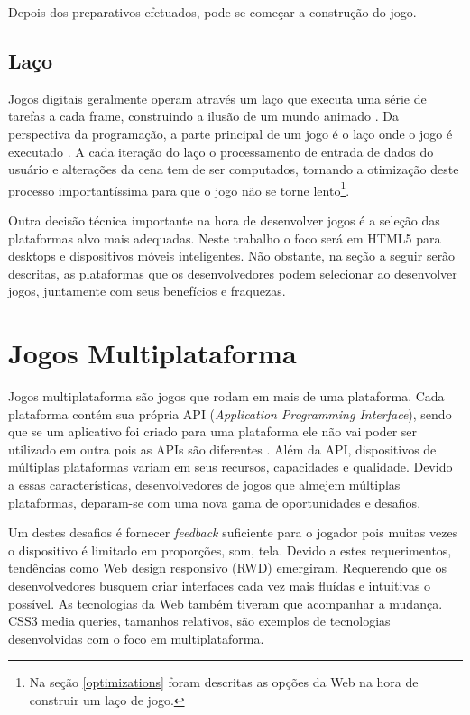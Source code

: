 Depois dos preparativos efetuados, pode-se começar a construção
do jogo.

\subsection{Laço}

Jogos digitais geralmente operam através um laço que executa uma
série de tarefas a cada frame, construindo a ilusão de um mundo
animado \autocite[p. 31]{gwt}. Da perspectiva da programação, a parte
principal de um jogo é o laço onde o jogo é executado \autocite[p.
17]{crossPlatformMobileGameDevelopment}. A cada iteração do laço
o processamento de entrada de dados do usuário e alterações da
cena tem de ser computados, tornando a otimização deste processo
importantíssima para que o jogo não se torne lento\footnote{Na seção
\ref{optimizations} foram descritas as opções da Web
na hora de construir um laço de jogo.}.

Outra decisão técnica importante na hora de desenvolver jogos é a
seleção das plataformas alvo mais adequadas. Neste trabalho o foco será
em  HTML5 para desktops e dispositivos móveis inteligentes. Não obstante,
na seção a seguir serão descritas, as plataformas que os
desenvolvedores podem selecionar ao desenvolver jogos, juntamente com
seus benefícios e fraquezas.

\section{Jogos Multiplataforma}

Jogos multiplataforma são jogos que rodam em mais de uma plataforma.
Cada plataforma contém sua própria API (\textit{Application
Programming Interface}), sendo que se um aplicativo foi criado para
uma plataforma ele não vai poder ser utilizado em outra pois as
APIs são diferentes \autocite{crossPlatformMobileGameDevelopment}.
Além da API, dispositivos de múltiplas plataformas variam em seus
recursos, capacidades e qualidade. Devido a essas características,
desenvolvedores de jogos que almejem múltiplas plataformas, deparam-se
com uma nova gama de oportunidades e desafios.

Um destes desafios é fornecer \textit{feedback} suficiente para o
jogador pois muitas vezes o dispositivo é limitado em proporções,
som, tela. Devido a estes requerimentos, tendências como Web design
responsivo (RWD) emergiram. Requerendo que os desenvolvedores busquem
criar interfaces cada vez mais fluídas e intuitivas o possível. As
tecnologias da Web também tiveram que acompanhar a mudança. CSS3 media
queries, tamanhos relativos, são exemplos de tecnologias desenvolvidas
com o foco em multiplataforma.

